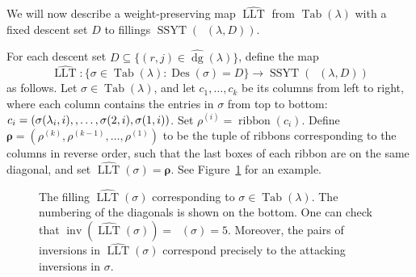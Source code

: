 \documentclass[ALCO,Unicode]{cedram}
\DeclareMathOperator{\PQT}{Tab}
\DeclareMathOperator{\dg}{dg}
\DeclareMathOperator{\inv}{inv}
\DeclareMathOperator{\Des}{Des}
\DeclareMathOperator{\ribbon}{ribbon}
\DeclareMathOperator{\SSYT}{SSYT}
\DeclareMathOperator{\LLT}{LLT}
\DeclareMathOperator{\boldnu}{\widehat{\boldsymbol{\nu}}}
\DeclareMathOperator{\invtwo}{\widehat{\inv}}
\newlength\cellsize \setlength\cellsize{12\unitlength}
\newcommand\cellify[1]{\def\thearg{#1}\def\nothing{}%
\ifx\thearg\nothing
\vrule width0pt height\cellsize depth0pt\else
\hbox to 0pt{\usebox2\hss}\fi%
\vbox to 12\unitlength{
\vss
\hbox to 12\unitlength{\hss$#1$\hss}
\vss}}
\newcommand\tableau[1]{\vtop{\let\\=\cr
\setlength\baselineskip{-16000pt}
\setlength\lineskiplimit{16000pt}
\setlength\lineskip{0pt}
\halign{&\cellify{##}\cr#1\crcr}}}
\begin{document}
We will now describe a weight-preserving map $\widehat{\LLT}$ from $\PQT(\lambda)$ with a fixed descent set $D$ to fillings $\SSYT(\boldnu(\lambda,D))$.


\begin{defn}\label{def:LLTtwo}
For each descent set $D \subseteq \{(r,j) \in \widehat{\dg}(\lambda)\}$, define the map 
\[
\widehat{\LLT}: \{\sigma\in \PQT(\lambda):\Des(\sigma)=D\} \rightarrow \SSYT(\boldnu(\lambda,D))
\] 
as follows. Let $\sigma\in\PQT(\lambda)$, and let $c_1,\ldots,c_k$ be its columns from left to right, where each column contains the entries in $\sigma$ from top to bottom: $c_i = (\sigma(\lambda_i,i),\linebreak[0],\ldots,\sigma(2,i),\sigma(1,i))$. 
Set $\rho^{(i)} = \ribbon(c_i)$. 
Define $\boldsymbol{\rho}=(\rho^{(k)},\rho^{(k-1)},\ldots,\rho^{(1)})$ to be the tuple of ribbons corresponding to the columns in reverse order, such that the last boxes of each ribbon are on the same diagonal, and set $\widehat{\LLT}(\sigma) = \boldsymbol{\rho}$. See Figure~\ref{fig:LLT_T} for an example.
\end{defn}

\begin{figure}[h]
\centering
{}
\caption{The filling $\widehat{\LLT}(\sigma)$ corresponding to $\sigma\in\PQT(\lambda)$. The numbering of the diagonals is shown on the bottom. One can check that $\inv(\widehat{\LLT}(\sigma))=\invtwo(\sigma) = 5$. Moreover, the pairs of inversions in $\widehat{\LLT}(\sigma)$
correspond precisely to the attacking inversions in $\sigma$.
}
\label{fig:LLT_T}
\end{figure}
\end{document}
